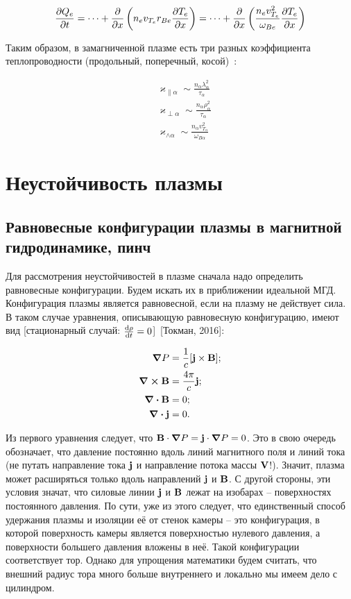 \documentclass[10pt, a4paper]{article}
\newcommand{\Tokman}{~[Токман, 2016]}
\let\stdsection\section
\renewcommand\section{\newpage\stdsection}
\begin{document}
\begin{equation*}
	\pdv{Q_e}{t} = \dots + \pdv{}{x}\left( n_e v_{T_e} r_{Be} \pdv{T_e}{x} \right) = \dots + \pdv{}{x}\left(\frac{n_e v_{T_e}^2}{\omega_{Be}}\pdv{T_e}{x} \right)
\end{equation*}

Таким образом, в замагниченной плазме есть три разных коэффициента теплопроводности (продольный, поперечный, косой)~\cite{kotelnikov}:

\begin{align*}
	&\varkappa_{\parallel\alpha} \sim \frac{n_\alpha \lambda_\alpha^2}{\tau_\alpha} \\
	&\varkappa_{\perp\alpha} \sim \frac{n_\alpha \rho_\alpha^2}{\tau_\alpha} \\
	&\varkappa_{\wedge\alpha} \sim \frac{n_\alpha v_{T_\alpha}^2}{\omega_{B\alpha}}
\end{align*}

\section{Неустойчивость плазмы}

\subsection{Равновесные конфигурации плазмы в магнитной гидродинамике, пинч}

Для рассмотрения неустойчивостей в плазме сначала надо определить равновесные конфигурации. Будем искать их в приближении идеальной МГД. Конфигурация плазмы является равновесной, если на плазму не действует сила. В таком случае уравнения, описывающую равновесную конфигурацию, имеют вид [стационарный случай: $\dv{\rho}{t}=0$]\Tokman:

\begin{align*}
	\grad{P} &= \frac{1}{c}[\vb{j}\times\vb{B}]; \\
	\curl\vb{B} &= \frac{4\pi}{c}\vb{j}; \\
	\div{\vb{B}} &= 0; \\
	\div{\vb{j}} &= 0.
\end{align*}

Из первого уравнения следует, что $\vb{B}\cdot\grad{P} = \vb{j}\cdot\grad{P} = 0$. Это в свою очередь обозначает, что давление постоянно вдоль линий магнитного поля и линий тока (не путать направление тока $\vb{j}$ и направление потока массы $\vb{V}$!). Значит, плазма может расширяться только вдоль направлений $\vb{j}$ и $\vb{B}$. С другой стороны, эти условия значат, что силовые линии $\vb{j}$ и $\vb{B}$ лежат на изобарах -- поверхностях постоянного давления. По сути, уже из этого следует, что единственный способ удержания плазмы и изоляции её от стенок камеры -- это конфигурация, в которой поверхность камеры является поверхностью нулевого давления, а поверхности большего давления вложены в неё. Такой конфигурации соответствует тор. Однако для упрощения математики будем считать, что внешний радиус тора много больше внутреннего и локально мы имеем дело с цилиндром.
\end{document}
